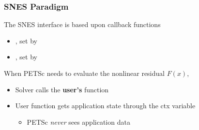 \begin{frame}
\frametitle{SNES Paradigm}

The SNES interface is based upon callback functions
\begin{itemize}
  \item {}, set by 

  \medskip

  \item {}, set by 
\end{itemize}

\bigskip

  When PETSc needs to evaluate the nonlinear residual $F(x)$,
\begin{itemize}
  \item Solver calls the {\bf user's} function

  \medskip

  \item User function gets application state through the {\kb ctx} variable
  \begin{itemize}
    \item PETSc \emph{never} sees application data
  \end{itemize}
\end{itemize}
\end{frame}
